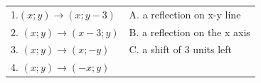 {{\begin{center}
\begin{xtabular}[t]{|l|l|}
    
        1.$\left(x;y\right)\to \left(x;y-3\right)$        &
    
    
        A. a reflection on x-y line%
     \tabularnewline{}
    
    
        2.
                    $\left(x;y\right)\to \left(x-3;y\right)$
                   &
    
    
        B. a reflection on the x axis%
     \tabularnewline{}
    
    
        3.
                    $\left(x;y\right)\to \left(x;-y\right)$
                   &
    
    
        C. a shift of 3 units left%
     \tabularnewline{}
    
    
        4.
                    $\left(x;y\right)\to \left(-x;y\right)$
                   &
    

\end{xtabular}
\end{center}}}

